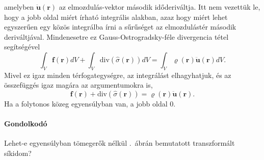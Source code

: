 \documentclass[12pt,a4paper]{scrartcl}
\let\mathbf\bm
\begin{document}
amelyben ${\mathbf{\ddot u\left({\mathbf{r}}\right)}}$ az elmozdulás-vektor második időderiváltja. Itt nem vezettük le, hogy a jobb oldal miért írható integrális alakban, azaz hogy miért lehet egyszerűen egy közös integrálba írni a sűrűséget az elmozdulástér második deriváltjával. Mindenesetre ez Gauss-Ostrogradsky-féle divergencia tétel segítségével
\[\int_V {{\mathbf{f}}\left( {\mathbf{r}} \right)dV}  + \int_V {{\text{div}}\left( {\hat \sigma \left( {\mathbf{r}} \right)} \right)dV}  = \int_V {\varrho \left( {\mathbf{r}} \right){\mathbf{\ddot u\left({\mathbf{r}}\right)}}dV} .\]
Mivel ez igaz minden térfogategységre, az integrálást elhagyhatjuk, és az összefüggés igaz magára az argumentumokra is,
\begin{equation}
{\mathbf{f}}\left( {\mathbf{r}} \right) + {\text{div}}\left( {\hat \sigma \left( {\mathbf{r}} \right)} \right) = \varrho \left( {\mathbf{r}} \right){\mathbf{\ddot u\left({\mathbf{r}}\right)}}.
\end{equation}
Ha a folytonos közeg egyensúlyban van, a jobb oldal 0.
\footnotesize
\paragraph{Gondolkodó}
Lehet-e egyensúlyban tömegerők nélkül \az{\ref{fig:homokora_nyujtas_szamolos}}.\ ábrán bemutatott transzformált síkidom?
\end{document}
